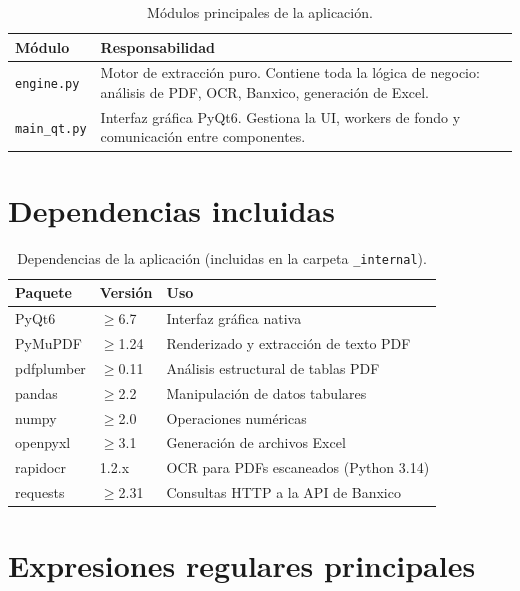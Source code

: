 \documentclass[12pt, a4paper, oneside]{report}
\begin{document}
\begin{table}[H]
  \centering
  \begin{tabularx}{\linewidth}{lX}
    \toprule
    \textbf{Módulo} & \textbf{Responsabilidad} \\
    \midrule
    \texttt{engine.py}   & Motor de extracción puro. Contiene toda la lógica de
                           negocio: análisis de PDF, OCR, Banxico, generación de Excel. \\
    \texttt{main\_qt.py} & Interfaz gráfica PyQt6. Gestiona la UI, workers de fondo
                           y comunicación entre componentes. \\
    \bottomrule
  \end{tabularx}
  \caption{Módulos principales de la aplicación.}
\end{table}

\section{Dependencias incluidas}

\begin{table}[H]
  \centering
  \begin{tabularx}{\linewidth}{llX}
    \toprule
    \textbf{Paquete} & \textbf{Versión} & \textbf{Uso} \\
    \midrule
    PyQt6         & $\geq$6.7  & Interfaz gráfica nativa \\
    PyMuPDF       & $\geq$1.24 & Renderizado y extracción de texto PDF \\
    pdfplumber    & $\geq$0.11 & Análisis estructural de tablas PDF \\
    pandas        & $\geq$2.2  & Manipulación de datos tabulares \\
    numpy         & $\geq$2.0  & Operaciones numéricas \\
    openpyxl      & $\geq$3.1  & Generación de archivos Excel \\
    rapidocr      & 1.2.x      & OCR para PDFs escaneados (Python 3.14) \\
    requests      & $\geq$2.31 & Consultas HTTP a la API de Banxico \\
    \bottomrule
  \end{tabularx}
  \caption{Dependencias de la aplicación (incluidas en la carpeta \texttt{\_internal}).}
\end{table}

\section{Expresiones regulares principales}
\end{document}
